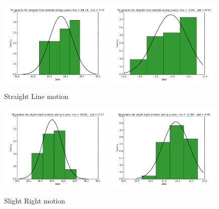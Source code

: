 \documentclass[10pt]{scrartcl}
\begin{document}
\begin{figure}[H]
\centering
\caption{Straight Line motion}
\label{fig:11}
\includegraphics[width=0.49\textwidth ]{images/straight_x_data}
\includegraphics[width=0.49\textwidth]{images/straight_y_data}
\end{figure}

\begin{figure}[H]
\centering
\caption{Slight Right motion}
\label{fig:12}
\includegraphics[width=0.49\textwidth ]{images/slight_right_x_data}
\includegraphics[width=0.49\textwidth]{images/slight_right_y_data}
\end{figure}
\end{document}
